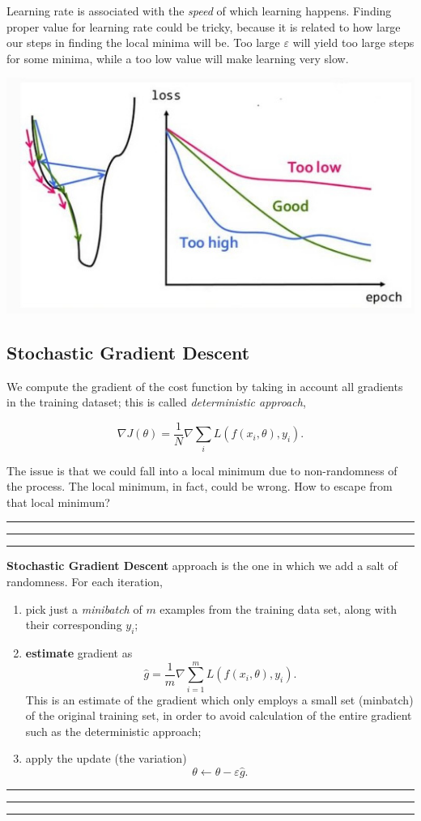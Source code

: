 \documentclass[10pt]{report}
\begin{document}
Learning rate is associated with the \emph{speed} of which learning happens.
Finding proper value for learning rate could be tricky, because it is
related to how large our steps in finding the local minima will be. Too
large \(\varepsilon\) will yield too large steps for some minima, while
a too low value will make learning very slow.

\begin{center}
\includegraphics[scale=0.3]{./pics/cnn/learning-rate.jpg}
\end{center}

\subsection{Stochastic Gradient Descent}
\label{sec:org967f8f1}
We compute the gradient of the cost function by taking in account all
gradients in the training dataset; this is called \emph{deterministic
approach},

\[\nabla J(\theta) = \frac{1}{N} \nabla \sum_i L(f(x_i, \theta), y_i).\]

The issue is that we could fall into a local minimum due to
non-randomness of the process. The local minimum, in fact, could be
wrong. How to escape from that local minimum?

\vspace*{0.6cm}\hrule
\hrule
\hrule
\vspace*{0.4cm}
\textbf{Stochastic Gradient Descent} approach is the one in which we add a salt
of randomness. For each iteration,

\begin{enumerate}
\item pick just a \emph{minibatch} of \(m\) examples from the training data set,
along with their corresponding \(y_i\);
\item \textbf{estimate} gradient as
\[\hat{g} = \frac{1}{m} \nabla \sum_{i=1}^m L(f(x_i, \theta), y_i).\]
This is an estimate of the gradient which only employs a small set
(minbatch) of the original training set, in order to avoid
calculation of the entire gradient such as the deterministic
approach;
\item apply the update (the variation)
\[\theta \leftarrow \theta - \varepsilon \hat{g}.\]
\end{enumerate}
\vspace*{0.6cm}\hrule
\hrule
\hrule
\vspace*{0.4cm}
\end{document}
